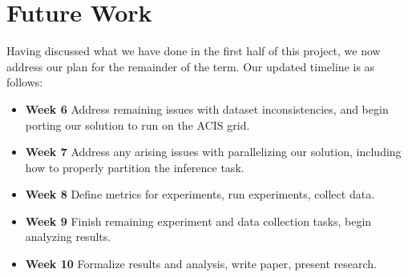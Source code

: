 \section{Future Work}
Having discussed what we have done in the first half of this project,
we now address our plan for the remainder of the term.
Our updated timeline is as follows:

\begin{itemize}
  \item \textbf{Week 6} Address remaining issues with dataset inconsistencies, and begin porting our solution
  to run on the ACIS grid.
  \item \textbf{Week 7} Address any arising issues with parallelizing our solution, including how to properly partition the inference task.
  \item \textbf{Week 8} Define metrics for experiments, run experiments, collect data.
  \item \textbf{Week 9} Finish remaining experiment and data collection tasks, begin analyzing results.
  \item \textbf{Week 10} Formalize results and analysis, write paper, present research.
\end{itemize}

